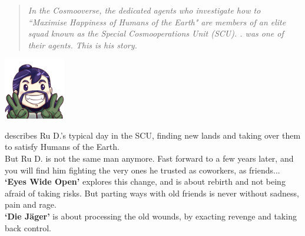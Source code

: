 \bckg


\begin{abstract}
\noindent
\emph{In the Cosmooverse, the dedicated agents who investigate how to ``Maximise Happiness of Humans of the Earth" are members of an elite squad known as the Special Cosmooperations Unit (SCU). . was one of their agents. This is his story.}
\end{abstract}

\begin{center}
\includegraphics[width=0.2\textwidth]{Assets/happyD_512}
\end{center}


 describes Ru D.'s typical day in the SCU, finding new lands and taking over them to satisfy Humans of the Earth.\\

But Ru D. is not the same man anymore. Fast forward to a few years later, and you will find him fighting the very ones he trusted as coworkers, as friends...\\

\textbf{`Eyes Wide Open'} explores this change, and is about rebirth and not being afraid of taking risks. But parting ways with old friends is never without sadness, pain and rage.\\

\textbf{`Die Jäger'} is about processing the old wounds, by exacting revenge and taking back control.

\clearpage